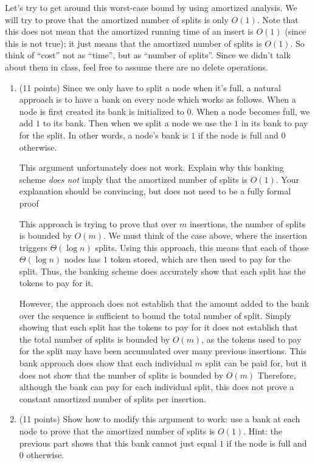 \documentclass[11pt]{article}
\begin{document}
Let's try to get around this worst-case bound by using amortized analysis.  We will try to prove that the amortized number of splits is only $O(1)$. 
Note that this does not mean that the amortized running time of an insert is $O(1)$ (since this is not true); 
it just means that the amortized number of splits is $O(1)$.  So think of ``cost'' not as ``time'', but as ``number of splits''. 
Since we didn't talk about them in class, feel free to assume there are no delete operations.  

\begin{enumerate}[resume]
\item (11 points) Since we only have to split a node when it's full, a natural approach is to have a bank on every node which works as follows. 
When a node is first created its bank is initialized to $0$.  When a node becomes full, we add $1$ to its bank. 
Then when we split a node we use the $1$ in its bank to pay for the split.  In other words, a node's bank is $1$ if the node is full and $0$ otherwise.

This argument unfortunately does not work.  Explain why this banking scheme \emph{does not} imply that the amortized number of splits is $O(1)$. 
Your explanation should be convincing, but does not need to be a fully formal proof

This approach is trying to prove that over $m$ insertions, the number of splits is bounded by $O(m)$. 
We must think of the case above, where the insertion triggers $\Theta(\log n)$ splits. 
Using this approach, this means that each of those $\Theta(\log n)$ nodes has $1$ token stored, which are then used to pay for the split. 
Thus, the banking scheme does accurately show that each split has the tokens to pay for it.

However, the approach does not establish that the amount added to the bank over the sequence is sufficient to bound the total number of split. 
Simply showing that each split has the tokens to pay for it does not establish that the total number of splits is bounded by $O(m)$, 
as the tokens used to pay for the split may have been accumulated over many previous insertions. 
This bank approach does show that each individual $m$ split can be paid for, but it does not show that the number of splits is bounded by $O(m)$
Therefore, although the bank can pay for each individual split, this does not prove a constant amortized number of splits per insertion.

\item (11 points) Show how to modify this argument to work: use a bank at each node to prove that the amortized number of splits is $O(1)$. 
Hint: the previous part shows that this bank cannot just equal $1$ if the node is full and $0$ otherwise.


\end{enumerate}
\end{document}
